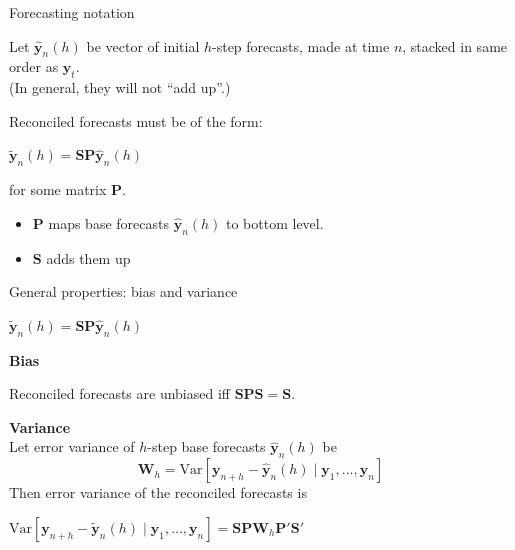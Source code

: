\documentclass[14pt]{beamer}
\makeatletter
\def\biz{\begin{itemize}[<+-| alert@+>]}
\def\eiz{\end{itemize}}
\def\var{\text{Var}}
\def\by{\bm{y}}
\def\bS{\bm{S}}
\def\bSigma{\bm{W}}
\makeatother
\begin{document}
\begin{frame}{Forecasting notation}


Let $\hat{\by}_n(h)$ be vector of initial $h$-step forecasts, made at time $n$, stacked in same order as $\by_t$. \pause\\  (In general, they will not ``add up''.)\pause

\begin{block}{}
Reconciled forecasts must be of the form:

\centerline{$ \tilde{\by}_{n}(h)=\bS\bm{P}\hat{\by}_{n}(h)$}

for some matrix $\bm{P}$.
\end{block}\pause
\biz
\item
$\bm{P}$ maps base forecasts $\hat{\by}_{n}(h)$ to bottom level.
\item
$\bS$ adds them up
\eiz
\end{frame}

\begin{frame}{General properties: bias and variance}

\begin{block}{}
\centerline{$ \tilde{\by}_{n}(h)=\bS\bm{P}\hat{\by}_{n}(h)$}
\end{block}\pause%

\textbf{\alert{Bias}}
\begin{alertblock}{}\centering
Reconciled forecasts are unbiased iff $\bS\bm{P}\bS=\bS$.\rlap{\phantom{g}}
\end{alertblock}\pause

\textbf{\alert{Variance}}\\
Let error variance of $h$-step base forecasts $\hat{\by}_n(h)$ be
$$\bSigma_h = \var[\by_{n+h} - \hat{\by}_{n}(h) \mid \by_1,\dots,\by_n] $$
Then error variance of the reconciled forecasts is
\begin{alertblock}{}
\centerline{$\var[\by_{n+h} - \tilde{\by}_{n}(h)  \mid \by_1,\dots,\by_n]  = \bS\bm{P}\bSigma_{h}\bm{P}'\bS'$}
\end{alertblock}



\end{frame}
\end{document}
